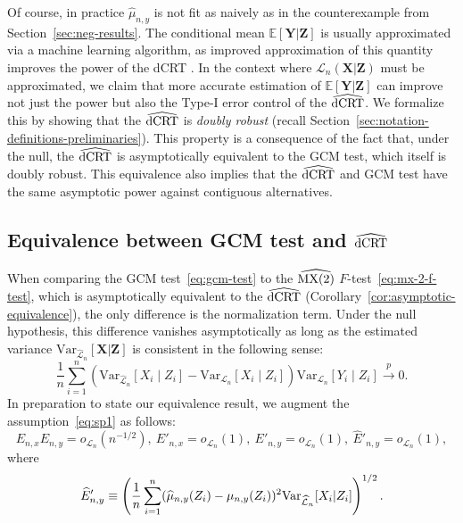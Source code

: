 \documentclass[aos]{imsart}
\theoremstyle{plain}
\theoremstyle{remark}
\newcommand{\E}{\mathbb E}								%
\newcommand{\V}{\mathrm{Var}}							%
\newcommand{\convp}{\overset p \rightarrow}             %
\newcommand{\prx}{\bm X}								%
\newcommand{\srx}{X}									%
\newcommand{\prz}{\bm Z}								%
\newcommand{\srz}{Z}									%
\newcommand{\pry}{{\bm Y}}								%
\newcommand{\law}{\mathcal L}							%
\newcommand{\lawhat}{\widehat{\mathcal L}}				%
\newcommand{\dCRThat}{\widehat{\textnormal{dCRT}}}		%
\newcommand{\MXtwohat}{\widehat{\textnormal{MX(2)}}}		%
\begin{document}
Of course, in practice $\widehat \mu_{n,y}$ is not fit as naively as in the counterexample from Section~\ref{sec:neg-results}. The conditional mean $\E[\pry|\prz]$ is usually approximated via a machine learning algorithm, as improved approximation of this quantity improves the power of the dCRT \citep{Katsevich2020a}. In the context where $\law_n(\prx|\prz)$ must be approximated, we claim that more accurate estimation of $\E[\pry|\prz]$ can improve not just the power but also the Type-I error control of the $\dCRThat$. We formalize this by showing that the $\dCRThat$ is \textit{doubly robust} (recall Section~\ref{sec:notation-definitions-preliminaries}). This property is a consequence of the fact that, under the null, the $\dCRThat$ is asymptotically equivalent to the GCM test, which itself is doubly robust. This equivalence also implies that the $\dCRThat$ and GCM test have the same asymptotic power against contiguous alternatives.

\subsection{Equivalence between GCM test and $\dCRThat$} \label{sec:equivalence}

When comparing the GCM test~\eqref{eq:gcm-test} to the $\MXtwohat$ $F$-test~\eqref{eq:mx-2-f-test}, which is asymptotically equivalent to the $\dCRThat$ (Corollary~\ref{cor:asymptotic-equivalence}), the only difference is the normalization term. Under the null hypothesis, this difference vanishes asymptotically as long as the estimated variance $\V_{\lawhat_n}[\prx|\prz]$ is consistent in the following sense:
\begin{equation}
    \frac{1}{n} \sum_{i=1}^n (\V_{\lawhat_n}[\srx_i\mid \srz_i]-\V_{\law_n}[\srx_i\mid \srz_i])\V_{\law_n}[Y_i \mid Z_i] \convp 0.
    \label{eq:variance-consistency}
\end{equation}
In preparation to state our equivalence result, we augment the assumption~\eqref{eq:sp1} as follows:
\begin{equation}
    E_{n, x} E_{n, y}  = o_{\law_n}(n^{-1/2}),\  E'_{n, x} = o_{\law_n}(1),\  E'_{n, y} = o_{\law_n}(1),\ \widehat E'_{n,y} = o_{\law_n}(1),
    \label{eq:sp1prime} \tag{SP1'}
\end{equation}
where
\begin{equation}
    \widehat E'_{n, y} \equiv \left(\frac{1}{n}\sum_{i = 1}^n (\widehat \mu_{n,y}(\srz_i) -  \mu_{n,y}(\srz_i))^2\textnormal{Var}_{\lawhat_n}[\srx_i|\srz_i]\right)^{1/2}.
\end{equation}
\end{document}
